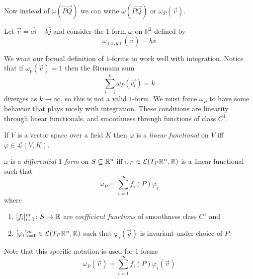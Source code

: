 \documentclass[notes.tex]{subfiles}
\begin{document}
Now instead of $\omega(\vec{PQ})$ we can write $\omega(\vec{PQ})$ or $\omega_{P}(\vec{v})$.

\begin{example}
    Let $\vec{v} = a\hat{i} + b\hat{j}$ and consider the $1$-form $\omega$ on $\mathbb{R}^2$ defined by
    \[
        \omega_{(x, y)}(\vec{v}) = bx
    \]
\end{example}

We want our formal definition of $1$-forms to work well with integration. Notice that if $\omega_p(\vec{v}) = 1$ then the Riemann sum
\[
    \sum_{i = 1}^k \omega_P(\vec{v_i}) = k
\]
diverges as $k \to \infty$, so this is not a valid $1$-form. We must force $\omega_P$ to have some behavior that plays nicely with integration. These conditions are linearity through linear functionals, and smoothness through functions of class $C^1$.

\begin{definition}
    If $V$ is a vector space over a field $K$ then $\varphi$ is a \textit{linear functional} on $V$ iff $\varphi \in \mathcal{L}(V, K)$.
\end{definition}

\begin{definition}
    $\omega$ is a \textit{differential $1$-form} on $S \subseteq \mathbb{R}^n$ iff $\omega_P \in \mathcal{L}(T_P \mathbb{R}^n, \mathbb{R})$ is a linear functional such that
    \[
        \omega_P = \sum_{i = 1}^m f_i(P)\varphi_i
    \]
    where
    \begin{enumerate}[label = \arabic*)]
        \item $[f_i]_{i = 1}^m\colon S \to \mathbb{R}$ are \textit{coefficient functions} of smoothness class $C^1$ and
        \item $[\varphi_i]_{i = 1}^m \in \mathcal{L}(T_P \mathbb{R}^n, \mathbb{R})$ such that $\varphi_i(\vec{v})$ is invariant under choice of $P$.
    \end{enumerate}
    Note that this specific notation is used for $1$-forms
    \[
        \omega_P(\vec{v}) = \sum_{i = 1}^m f_i(P)\varphi_i(\vec{v})
    \]
\end{definition}
\end{document}
